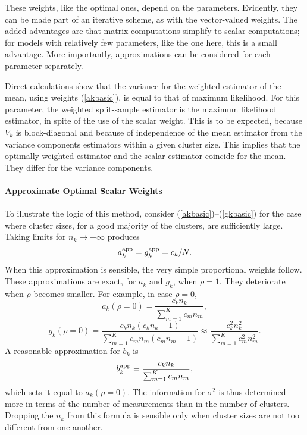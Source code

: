 \documentclass[11pt,a5paper,twoside]{book}
\let\oldparagraph\paragraph
\renewcommand{\paragraph}[1]{\oldparagraph{#1}\mbox{}}
\begin{document}
These weights, like the optimal ones, depend on the parameters. 
Evidently, they can be made part of an iterative scheme, as with the vector-valued weights. The added advantages are that 
matrix computations simplify to scalar computations; for models 
with relatively few parameters, like the one here, this is a 
small advantage. More importantly, approximations can be 
considered for each parameter separately.

Direct calculations show that the variance for the weighted estimator 
of the mean, using weights (\ref{akbasic}), is equal to that of maximum 
likelihood. For this parameter, the weighted split-sample estimator 
is the maximum likelihood estimator, in spite of the use of the 
scalar weight. This is to be expected, because $V_k$ is block-diagonal 
and because of independence of the mean estimator from the variance 
components estimators within a given cluster size. This implies 
that the optimally weighted estimator and the scalar estimator 
coincide for the mean. They differ for the variance 
components.

\paragraph{Approximate Optimal Scalar Weights}\label{aow}

To illustrate the logic of this method, consider 
(\ref{akbasic})--(\ref{gkbasic}) for the case where 
cluster sizes, for a good majority of the clusters, 
are sufficiently large. Taking limits for $n_k\rightarrow+\infty$ produces
\begin{equation}
a_k^{\mbox{\scriptsize app}}=g_k^{\mbox{\scriptsize app}}=c_k/N.
\label{aoweq}
\end{equation}
When this approximation is sensible, the very simple proportional 
weights follow. These approximations are exact, for $a_k$ and $g_k$, 
when $\rho=1$. They deteriorate when $\rho$ becomes smaller. For 
example, in case $\rho=0$,
$$
a_k(\rho=0)=\frac{c_kn_k}{\sum_{m=1}^Kc_mn_m},
$$
$$
g_k(\rho=0)=\frac{c_kn_k(c_kn_k-1)}{\sum_{m=1}^Kc_mn_m(c_mn_m-1)}\approx
\frac{c_k^2n_k^2}{\sum_{m=1}^Kc_m^2n_m^2}.
$$
A reasonable approximation for $b_k$ is
\begin{equation}
\label{bkapprox}
b_k^{\mbox{\scriptsize app}}=\frac{c_kn_k}{\sum_{m=1}^Kc_mn_m},
\end{equation}
which sets it equal to $a_k(\rho=0)$. The information 
for $\sigma^2$ is thus determined more in terms of the number of measurements than in the number of clusters. Dropping the $n_k$ from this 
formula is sensible only when cluster sizes are not too different 
from one another.
\end{document}
